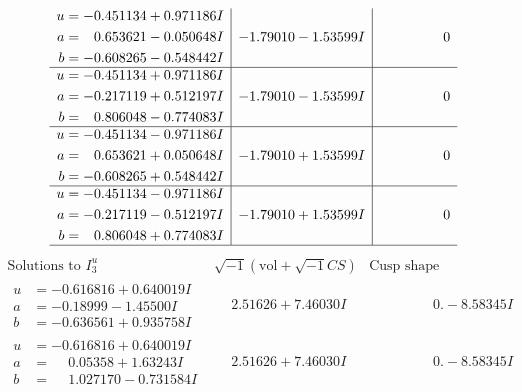 \documentclass[1p]{elsarticle_modified}
\theoremstyle{definition}
\newcommand{\I}{\sqrt{-1}}
\begin{document}
$$\begin{array}{c|c|c}
\begin{aligned}
u &= -0.451134 + 0.971186 I \\
a &= \phantom{-}0.653621 - 0.050648 I \\
b &= -0.608265 - 0.548442 I\end{aligned}
 & -1.79010 - 1.53599 I & \phantom{-0.000000 } 0 \\ \hline\begin{aligned}
u &= -0.451134 + 0.971186 I \\
a &= -0.217119 + 0.512197 I \\
b &= \phantom{-}0.806048 - 0.774083 I\end{aligned}
 & -1.79010 - 1.53599 I & \phantom{-0.000000 } 0 \\ \hline\begin{aligned}
u &= -0.451134 - 0.971186 I \\
a &= \phantom{-}0.653621 + 0.050648 I \\
b &= -0.608265 + 0.548442 I\end{aligned}
 & -1.79010 + 1.53599 I & \phantom{-0.000000 } 0 \\ \hline\begin{aligned}
u &= -0.451134 - 0.971186 I \\
a &= -0.217119 - 0.512197 I \\
b &= \phantom{-}0.806048 + 0.774083 I\end{aligned}
 & -1.79010 + 1.53599 I & \phantom{-0.000000 } 0\\
 \hline 
 \end{array}$$\newpage$$\begin{array}{c|c|c}  
\text{Solutions to }I^u_{3}& \I (\text{vol} + \sqrt{-1}CS) & \text{Cusp shape}\\
 \hline 
\begin{aligned}
u &= -0.616816 + 0.640019 I \\
a &= -0.18999 - 1.45500 I \\
b &= -0.636561 + 0.935758 I\end{aligned}
 & \phantom{-}2.51626 + 7.46030 I & \phantom{-0.000000 } 0. - 8.58345 I \\ \hline\begin{aligned}
u &= -0.616816 + 0.640019 I \\
a &= \phantom{-}0.05358 + 1.63243 I \\
b &= \phantom{-}1.027170 - 0.731584 I\end{aligned}
 & \phantom{-}2.51626 + 7.46030 I & \phantom{-0.000000 } 0. - 8.58345 I \\ \hline\begin{aligned}

\end{aligned}
\end{array}$$
\end{document}
